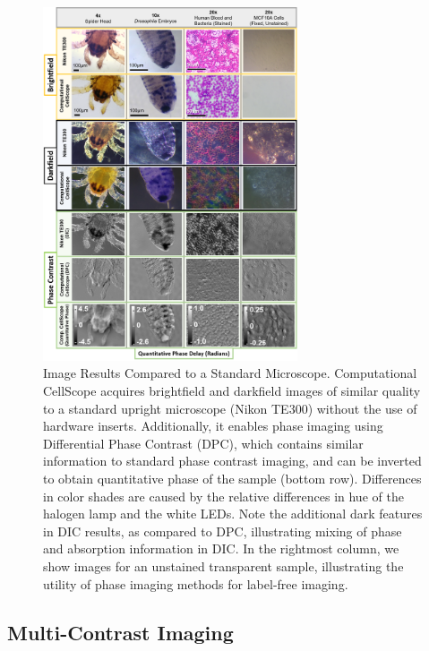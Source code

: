 \begin{figure}
\begin{center}
\includegraphics[width=0.67\textwidth]{figures/fig_ccs_mosaic.png}
\end{center}
\caption {{Image Results Compared to a Standard Microscope.} Computational CellScope acquires brightfield and darkfield images of similar quality to a standard upright microscope (Nikon TE300) without the use of hardware inserts. Additionally, it enables phase imaging using Differential Phase Contrast (DPC), which contains similar information to standard phase contrast imaging, and can be inverted to obtain quantitative phase of the sample (bottom row). Differences in color shades are caused by the relative differences in hue of the halogen lamp and the white LEDs. Note the additional dark features in DIC results, as compared to DPC, illustrating mixing of phase and absorption information in DIC. In the rightmost column, we show images for an unstained transparent sample, illustrating the utility of phase imaging methods for label-free imaging.
}
\label{fig:contrastcomparison}
\end{figure}

\subsection{Multi-Contrast Imaging}


